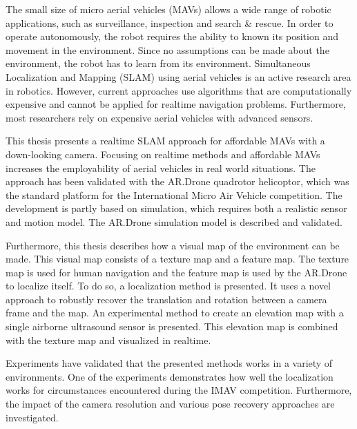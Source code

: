 The small size of micro aerial vehicles (MAVs) allows a wide range of robotic applications, such as surveillance, inspection and search \& rescue.
In order to operate autonomously, the robot requires the ability to known its position and movement in the environment.
Since no assumptions can be made about the environment, the robot has to learn from its environment.
Simultaneous Localization and Mapping (SLAM) using aerial vehicles is an active research area in robotics.
However, current approaches use algorithms that are computationally expensive and cannot be applied for realtime navigation problems.
Furthermore, most researchers rely on expensive aerial vehicles with advanced sensors.

This thesis presents a realtime SLAM approach for affordable MAVs with a down-looking camera.
Focusing on realtime methods and affordable MAVs increases the employability of aerial vehicles in  real world situations.
The approach has been validated with the AR.Drone quadrotor helicoptor, which was the standard platform for the International Micro Air Vehicle competition.
The development is partly based on simulation, which requires both a realistic sensor and motion model.
The AR.Drone simulation model is described and validated.

Furthermore, this thesis describes how a visual map of the environment can be made.
This visual map consists of a texture map and a feature map. The texture map is used for human navigation and the feature map is used by the AR.Drone to localize itself.
To do so, a localization method is presented.
It uses a novel approach to robustly recover the translation and rotation between a camera frame and the map.
An experimental method to create an elevation map with a single airborne ultrasound sensor is presented.
This elevation map is combined with the texture map and visualized in realtime.

Experiments have validated that the presented methods works in a variety of environments.
One of the experiments demonstrates how well the localization works for circumstances encountered during the IMAV competition. 
Furthermore, the impact of the camera resolution and various pose recovery approaches are investigated.





